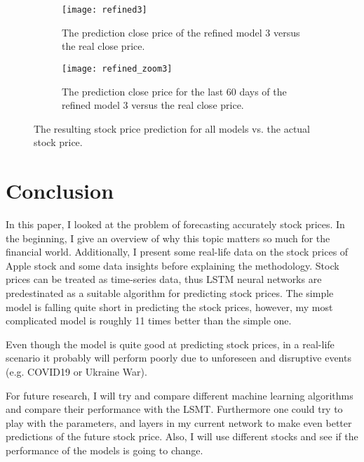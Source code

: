 \documentclass[fleqn,10pt]{SelfArx} %
\begin{document}
\begin{figure*}[htb]
\medskip
\begin{subfigure}{0.85\columnwidth}
	\texttt{[image: refined3]}
	\caption{The prediction close price of the refined model 3 versus the real close price.}
	\label{fig:refined3}
	\end{subfigure}\hfil%
\begin{subfigure}{0.85\columnwidth}
	\texttt{[image: refined\_zoom3]}
	\caption{The prediction close price for the last 60 days of the refined model 3 versus the real close price.}
	\label{fig:refined_zoom3}
	\end{subfigure}
	\label{fig.results}
	\caption{The resulting stock price prediction for all models vs. the actual stock price.}
\end{figure*}



\section{Conclusion}
In this paper, I looked at the problem of forecasting accurately stock prices. In the beginning, I give an overview of why this topic matters so much for the financial world. Additionally, I present some real-life data on the stock prices of Apple stock and some data insights before explaining the methodology. Stock prices can be treated as time-series data, thus LSTM neural networks are predestinated as a suitable algorithm for predicting stock prices. The simple model is falling quite short in predicting the stock prices, however, my most complicated model is roughly 11 times better than the simple one. 

Even though the model is quite good at predicting stock prices, in a real-life scenario it probably will perform poorly due to unforeseen and disruptive events (e.g. COVID19 or Ukraine War).

For future research, I will try and compare different machine learning algorithms and compare their performance with the LSMT. Furthermore one could try to play with the parameters, and layers in my current network to make even better predictions of the future stock price. Also, I will use different stocks and see if the performance of the models is going to change.








{} %



\end{document}
